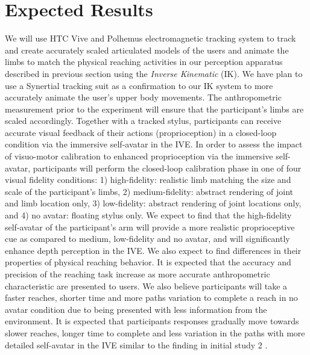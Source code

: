 \section{Expected Results}
We will use HTC Vive and Polhemus electromagnetic tracking system to track and create accurately scaled articulated models of the users and animate the limbs to match the physical reaching activities in our perception apparatus described in previous section using the \textit{Inverse Kinematic} (IK). We have plan to use a Synertial tracking suit as a confirmation to our IK system to more accurately animate the user's upper body movements. The anthropometric measurement prior to the experiment will ensure that the participant’s limbs are scaled accordingly. Together with a tracked stylus, participants can receive accurate visual feedback of their actions (proprioception) in a closed-loop condition via the immersive self-avatar in the IVE. In order to assess the impact of visuo-motor calibration to enhanced proprioception via the immersive self-avatar, participants will perform the closed-loop calibration phase in one of four visual fidelity conditions: 1) high-fidelity: realistic limb matching the size and scale of the participant’s limbs, 2) medium-fidelity: abstract rendering of joint and limb location only, 3) low-fidelity: abstract rendering of joint locations only, and 4) no avatar: floating stylus only. We expect to find that the high-fidelity self-avatar of the participant’s arm will provide a more realistic proprioceptive cue as compared to medium, low-fidelity and no avatar, and will significantly enhance depth perception in the IVE. We also expect to find differences in their properties of physical reaching behavior. It is expected that the accuracy and precision of the reaching  task increase as more accurate anthropometric characteristic are presented to users. We also believe participants will take a faster reaches, shorter time and more paths variation to complete a reach in no avatar condition due to being presented with less information from the environment. It is expected that participants responses gradually move towards slower reaches, longer time to complete and less variation in the paths with more detailed self-avatar in the IVE similar to the finding in initial study 2 \cite{EBP+16}. 

